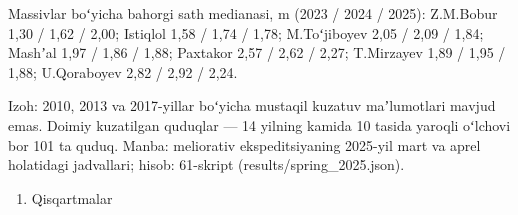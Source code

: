 Massivlar boʻyicha bahorgi sath medianasi, m (2023 / 2024 / 2025):
Z.M.Bobur 1,30 / 1,62 / 2,00; Istiqlol 1,58 / 1,74 / 1,78; M.Toʻjiboyev
2,05 / 2,09 / 1,84; Mashʼal 1,97 / 1,86 / 1,88; Paxtakor 2,57 / 2,62 /
2,27; T.Mirzayev 1,89 / 1,95 / 1,88; U.Qoraboyev 2,82 / 2,92 / 2,24.

Izoh: 2010, 2013 va 2017-yillar boʻyicha mustaqil kuzatuv maʼlumotlari
mavjud emas. Doimiy kuzatilgan quduqlar --- 14 yilning kamida 10 tasida
yaroqli oʻlchovi bor 101 ta quduq. Manba: meliorativ ekspeditsiyaning
2025-yil mart va aprel holatidagi jadvallari; hisob: 61-skript
(results/spring\_2025.json).



\begin{enumerate}
\def\labelenumi{\alph{enumi})}
\tightlist
\item
  Qisqartmalar
\end{enumerate}

